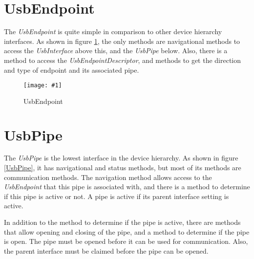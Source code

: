 \documentclass{article}
\newcommand{\myinterface}[1]{\emph{#1}}
\newcommand{\mysectionend}[0]{\vfill\pagebreak[1]}
\newcommand{\myfigure}[3]{\begin{figure}[htbp]\centering\texttt{[image: \#1]}\caption{#2}\label{#3}\end{figure}}
\begin{document}
\mysectionend

%

\section{UsbEndpoint}

The \myinterface{UsbEndpoint} is quite simple in comparison to other device hierarchy
interfaces.  As shown in figure \ref{UsbEndpoint}, the only methods are
navigational methods to access the \myinterface{UsbInterface} above this, and the
\myinterface{UsbPipe} below.  Also, there is a method to access the \myinterface{UsbEndpointDescriptor},
and methods to get the direction and type of endpoint and its associated
pipe.

\myfigure{figs/UsbEndpoint}{UsbEndpoint}{UsbEndpoint}

\mysectionend

%

\section{UsbPipe}

The \myinterface{UsbPipe} is the lowest interface in the device hierarchy.  As shown in
figure \ref{UsbPipe}, it has navigational and status methods, but most of
its methods are communication methods.  The navigation method allows
access to the \myinterface{UsbEndpoint} that this pipe is associated with, and there
is a method to determine if this pipe is active or not.  A pipe is
active if its parent interface setting is active.

In addition to the method to determine if the pipe is active, there
are methods that allow opening and closing of the pipe, and a method
to determine if the pipe is open.  The pipe must be opened before
it can be used for communication.  Also, the parent interface must
be claimed before the pipe can be opened.
\end{document}
